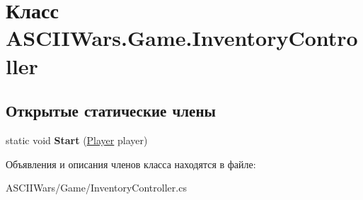 \hypertarget{class_a_s_c_i_i_wars_1_1_game_1_1_inventory_controller}{}\section{Класс A\+S\+C\+I\+I\+Wars.\+Game.\+Inventory\+Controller}
\label{class_a_s_c_i_i_wars_1_1_game_1_1_inventory_controller}
\subsection*{Открытые статические члены}
\begin{DoxyCompactItemize}
\item 
\hypertarget{class_a_s_c_i_i_wars_1_1_game_1_1_inventory_controller_a7cf0556bdbb8dd155a09050d81110f1e}{}\label{class_a_s_c_i_i_wars_1_1_game_1_1_inventory_controller_a7cf0556bdbb8dd155a09050d81110f1e} 
static void {\bfseries Start} (\hyperlink{class_a_s_c_i_i_wars_1_1_game_1_1_player}{Player} player)
\end{DoxyCompactItemize}


Объявления и описания членов класса находятся в файле\+:\begin{DoxyCompactItemize}
\item 
A\+S\+C\+I\+I\+Wars/\+Game/Inventory\+Controller.\+cs\end{DoxyCompactItemize}
